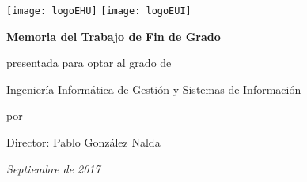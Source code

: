 
\begin{titlepage}
	\texttt{[image: logoEHU]}
	\hspace{\fill}
	\texttt{[image: logoEUI]}
	\vspace{1.5cm}
	\begin{center}
		
			\vspace{0.5cm}
		
		{\Huge \textbf{\thetitle}}
		
			\vspace{3cm}
		
		{\large \textbf{Memoria del Trabajo de Fin de Grado}}
		
			\vspace{0.5cm}
		
		{\normalsize presentada para optar al grado de}
		
			\vspace{0.5cm}
			
		{\Large Ingeniería Informática de Gestión y Sistemas de Información}
		
			\vspace{1.5cm}
		
		{\normalsize por}

		\LARGE{\theauthor}
		
			\vspace{1cm}
		
		{\large Director: Pablo González Nalda}
		
			\vspace{2cm}
		
		{\Large\textit{Septiembre de 2017}}

	\end{center}
\end{titlepage}

